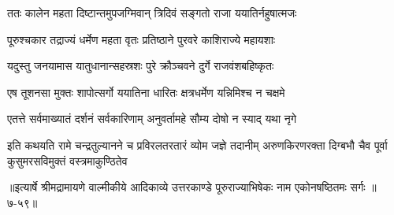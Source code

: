 \twolineshloka
{ततः कालेन महता दिष्टान्तमुपजग्मिवान्}
{त्रिदिवं सङ्गतो राजा ययातिर्नहुषात्मजः} %

\twolineshloka
{पूरुश्चकार तद्राज्यं धर्मेण महता वृतः}
{प्रतिष्ठाने पुरवरे काशिराज्ये महायशाः} %

\twolineshloka
{यदुस्तु जनयामास यातुधानान्सहस्रशः}
{पुरे क्रौञ्चवने दुर्गे राजवंशबहिष्कृतः} %

\twolineshloka
{एष तूशनसा मुक्तः शापोत्सर्गो ययातिना}
{धारितः क्षत्रधर्मेण यन्निमिश्च न चक्षमे} %

\twolineshloka
{एतत्ते सर्वमाख्यातं दर्शनं सर्वकारिणाम्}
{अनुवर्तामहे सौम्य दोषो न स्याद् यथा नृगे} %

\twolineshloka
{इति कथयति रामे चन्द्रतुल्यानने च प्रविरलतरतारं व्योम जज्ञे तदानीम्}
{अरुणकिरणरक्ता दिग्बभौ चैव पूर्वा कुसुमरसविमुक्तं वस्त्रमाकुण्ठितेव} %


॥इत्यार्षे श्रीमद्रामायणे वाल्मीकीये आदिकाव्ये उत्तरकाण्डे पूरुराज्याभिषेकः नाम एकोनषष्ठितमः सर्गः ॥७-५९॥
